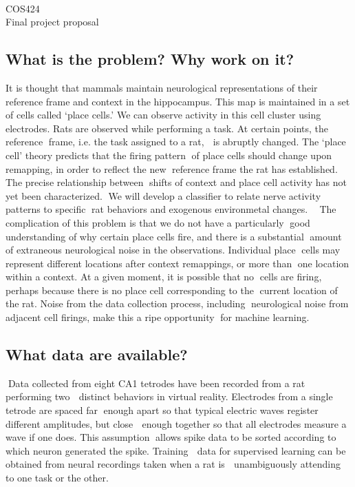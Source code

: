 \documentclass[11pt]{article}
\begin{document}
\setcounter{section}{0}
\setcounter{subsection}{0}
\setcounter{subsubsection}{0}
\ \ \\
COS424 \\
Final project proposal
\\

\subsection*{What is the problem? Why work on it?}
It is thought that mammals maintain neurological representations of their 
reference frame and context in the hippocampus. This map is maintained in a set 
of cells called `place cells.' We can observe activity in this cell cluster 
using electrodes. Rats are observed while performing a task. At certain points, 
the reference
frame, i.e. the task assigned to a rat,
 is abruptly changed. The `place cell' theory predicts that the firing pattern
of place cells should change upon remapping, in order to reflect the new
reference frame the rat has established. The precise relationship between
shifts of context and place cell activity has not yet been characterized.
We will develop a classifier to relate nerve activity patterns to specific
rat behaviors and exogenous environmetal changes.

The complication of this problem is that we do not have a particularly
good understanding of why certain place cells fire, and there is a substantial
amount of extraneous neurological noise in the observations. Individual place
cells may represent different locations after context remappings, or more than
one location within a context. At a given moment, it is possible that no
cells are firing, perhaps because there is no place cell corresponding to the
current location of the rat. Noise from the data collection process, including
neurological noise from adjacent cell firings, make this a ripe opportunity
for machine learning.

\subsection*{What data are available?}
Data collected from eight CA1 tetrodes have been recorded from a rat performing 
two
 distinct behaviors in virtual reality. Electrodes from a single tetrode are 
spaced far 
enough apart so that typical electric waves register different amplitudes, but 
close
 enough together so that all electrodes measure a wave if one does. This 
assumption 
allows spike data to be sorted according to which neuron generated the spike. 
Training
 data for supervised learning can be obtained from neural recordings taken when 
a rat is
 unambiguously attending to one task or the other.


\end{document}
